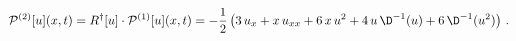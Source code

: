 \begin{equation*}
{\mathcal{P}}^{(2)}[u](x,t) = R^\dag[u]\cdot{\mathcal{P}}^{(1)}[u](x,t) =
-\frac{1}{2}\left(3\,u_x + x\,u_{xx} +6\,x\,u^2 + 4\,u\,\D^{-1}(u) +
6\,\D^{-1}(u^2) \right)\,.
\end{equation*}

